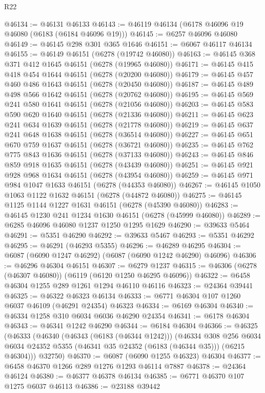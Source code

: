 \begin{lexlean}{R22}
\begin{coremodule}
@46134 := @46131 @46133
@46143 := @46119 @46134 (@6178 @46096 @19 @46080 (@6183 (@6184 @46096 @19)))
@46145 := @6257 @46096 @46080
@46149 := @46145 @298 @301 @365 @1646
@46151 := @6067 @46117 @46134
@46155 := @46149 @46151 (@6278 (@19742 @46080))
@46163 := @46145 @368 @371 @412 @1645 @46151 (@6278 (@19965 @46080))
@46171 := @46145 @415 @418 @454 @1644 @46151 (@6278 (@20200 @46080))
@46179 := @46145 @457 @460 @486 @1643 @46151 (@6278 (@20450 @46080))
@46187 := @46145 @489 @498 @566 @1642 @46151 (@6278 (@20762 @46080))
@46195 := @46145 @569 @241 @580 @1641 @46151 (@6278 (@21056 @46080))
@46203 := @46145 @583 @590 @620 @1640 @46151 (@6278 (@21336 @46080))
@46211 := @46145 @623 @241 @634 @1639 @46151 (@6278 (@21778 @46080))
@46219 := @46145 @637 @241 @648 @1638 @46151 (@6278 (@36514 @46080))
@46227 := @46145 @651 @670 @759 @1637 @46151 (@6278 (@36721 @46080))
@46235 := @46145 @762 @775 @843 @1636 @46151 (@6278 (@37133 @46080))
@46243 := @46145 @846 @859 @918 @1635 @46151 (@6278 (@43439 @46080))
@46251 := @46145 @921 @928 @968 @1634 @46151 (@6278 (@43954 @46080))
@46259 := @46145 @971 @984 @1047 @1633 @46151 (@6278 (@44353 @46080))
@46267 := @46145 @1050 @1063 @1122 @1632 @46151 (@6278 (@44872 @46080))
@46275 := @46145 @1125 @1144 @1227 @1631 @46151 (@6278 (@45390 @46080))
@46283 := @46145 @1230 @241 @1234 @1630 @46151 (@6278 (@45999 @46080))
@46289 := @6285 @46096 @46080 @1237 @1250 @1295 @1629
@46290 := @39633 @5464
@46291 := @5351 @46290
@46292 := @39633 @5467
@46293 := @5351 @46292
@46295 := @46291 (@46293 @5355)
@46296 := @46289 @46295
@46304 := @6087 (@6090 @1247 @46292) (@6087 (@6090 @1242 @46290) @46096)
@46306 := @46296 @46304 @46151
@46307 := @6279 @1237
@46315 := @46306 (@6278 (@46307 @46080)) (@6119 (@6120 @1250 @46295 @46096))
@46322 := @6458 @46304 @1255 @289 @1261 @1294 @46110 @46116
@46323 := @24364 @39441
@46325 := @46322 @46323 @46134
@46333 := @6771 @46304 @107 @1260 @6037 @46109 (@46291 @24354) @46323
@46334 := @6169 @46304
@46340 := @46334 @1258 @310 @6034 @6036 @46290 @24354
@46341 := @6178 @46304
@46343 := @46341 @1242 @46290
@46344 := @6184 @46304
@46366 := @46325
    (@46333
      (@46340
        (@46343 (@6183 (@46344 @1242)))
        (@46334
          @308
          @256
          @6034
          @6034
          @24352
          @5355
          (@46341 @35 @24352 (@6183 (@46344 @35)))
          (@6215 @46304)))
      @32750)
@46370 := @6087 (@6090 @1255 @46323) @46304
@46377 := @6458 @46370 @1266 @289 @1276 @1293 @46114 @7887
@46378 := @24364 @46124
@46380 := @46377 @46378 @46134
@46385 := @6771 @46370 @107 @1275 @6037 @46113
@46386 := @23188 @39442

\end{coremodule}
\end{lexlean}
